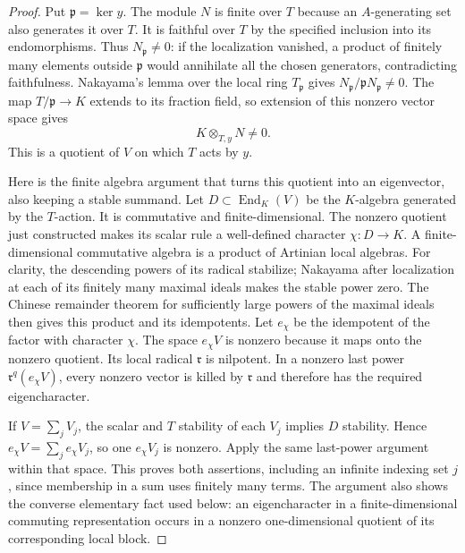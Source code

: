 \documentclass[11pt,a4paper]{article}
\numberwithin{equation}{section}
\theoremstyle{remark}\newtheorem{remark}[theorem]{Remark}
\begin{document}
\begin{proof}
Put $\mathfrak p=\ker y$.  The module $N$ is finite over $T$
because an $A$-generating set also generates it over $T$.
It is faithful over $T$ by the specified inclusion into its
endomorphisms.  Thus $N_{\mathfrak p}\ne0$: if the localization
vanished, a product of finitely many elements outside
$\mathfrak p$ would annihilate all the chosen generators,
contradicting faithfulness.  Nakayama's lemma over the local
ring $T_{\mathfrak p}$ gives
$N_{\mathfrak p}/\mathfrak pN_{\mathfrak p}\ne0$.
The map $T/\mathfrak p\to K$ extends to its fraction field,
so extension of this nonzero vector space gives
\[
       K\otimes_{T,y}N\ne0.
\]
This is a quotient of $V$ on which $T$ acts by $y$.

Here is the finite algebra argument that turns this quotient
into an eigenvector, also keeping a stable summand.  Let
$D\subset\operatorname{End}_K(V)$ be the $K$-algebra generated
by the $T$-action.  It is commutative and finite-dimensional.
The nonzero quotient just constructed makes its scalar rule
a well-defined character $\chi:D\to K$.  A finite-dimensional
commutative algebra is a product of Artinian local algebras.
For clarity, the descending powers of its radical stabilize;
Nakayama after localization at each of its finitely many
maximal ideals makes the stable power zero.  The Chinese
remainder theorem for sufficiently large powers of the
maximal ideals then gives this product and its idempotents.
Let $e_\chi$ be the idempotent of the factor with character
$\chi$.  The space $e_\chi V$ is nonzero because it maps
onto the nonzero quotient.  Its local radical $\mathfrak r$
is nilpotent.  In a nonzero last power
$\mathfrak r^q(e_\chi V)$, every nonzero vector is killed by
$\mathfrak r$ and therefore has the required eigencharacter.

If $V=\sum_jV_j$, the scalar and $T$ stability of each $V_j$
implies $D$ stability.  Hence
$e_\chi V=\sum_je_\chi V_j$, so one $e_\chi V_j$ is nonzero.
Apply the same last-power argument within that space.
This proves both assertions, including an infinite indexing
set $j$, since membership in a sum uses finitely many terms.
The argument also shows the converse elementary fact used
below: an eigencharacter in a finite-dimensional commuting
representation occurs in a nonzero one-dimensional quotient
of its corresponding local block.
\end{proof}

\end{document}
